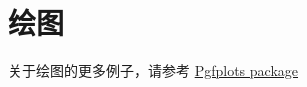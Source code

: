\section{绘图}
关于绘图的更多例子，请参考 \href{https://www.overleaf.com/learn/latex/Pgfplots_package}{Pgfplots package}

